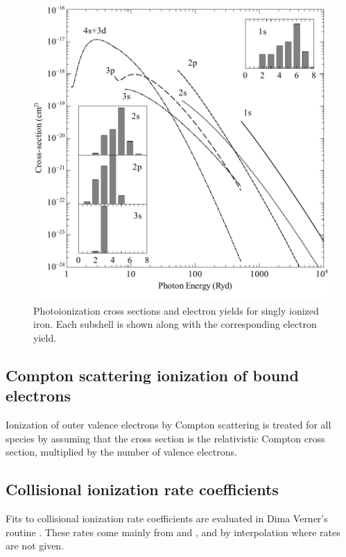 \begin{figure}
\centering
\includegraphics[scale=0.6]{IronPhoto}
\caption[Photoionization cross sections and yields for Fe$^+$]
{Photoionization cross sections and electron yields for singly
ionized iron.  Each subshell is shown along with the corresponding electron
yield.}
\label{fig:IronPhoto}
\end{figure}

\subsection{Compton scattering ionization of bound electrons}

Ionization of outer valence electrons by Compton scattering is treated
for all species by assuming that the cross section is the relativistic
Compton cross section, multiplied by the number of valence electrons.

\subsection{Collisional ionization rate coefficients}

Fits to collisional ionization rate coefficients are evaluated in Dima
Verner's routine .
These rates come mainly from \citet{Arnaud1992}
and \citet{Arnaud1985}, and by interpolation where rates
are not given.

